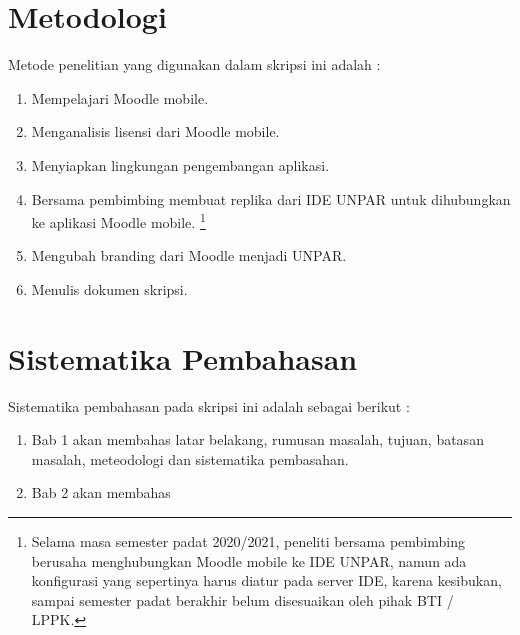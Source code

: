 \section{Metodologi}
\label{sec:metlit}
Metode penelitian yang digunakan dalam skripsi ini adalah :
\begin{enumerate}
		\item Mempelajari Moodle mobile.
		\item Menganalisis lisensi dari Moodle mobile.
		\item Menyiapkan lingkungan pengembangan aplikasi.
		\item Bersama pembimbing membuat replika dari IDE UNPAR untuk dihubungkan ke aplikasi Moodle mobile. \footnote{Selama masa semester padat 2020/2021, peneliti bersama pembimbing berusaha menghubungkan Moodle mobile ke IDE UNPAR, namun ada konfigurasi yang sepertinya harus diatur pada server IDE, karena kesibukan, sampai semester padat berakhir belum disesuaikan oleh pihak BTI / LPPK.}
		\item Mengubah branding dari Moodle menjadi UNPAR.
		\item Menulis dokumen skripsi.
\end{enumerate}

\section{Sistematika Pembahasan}
\label{sec:sispem}
 Sistematika pembahasan pada skripsi ini adalah sebagai berikut :
 \begin{enumerate}
 	\item Bab 1 akan membahas latar belakang, rumusan masalah, tujuan, batasan masalah, meteodologi dan sistematika pembasahan.
 	\item Bab 2 akan membahas 
 \end{enumerate}